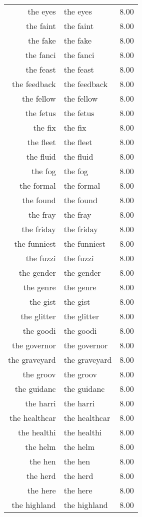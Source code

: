 \begin{table}[ht]
\begin{tabular}{rlr}
  the eyes & the eyes & 8.00 \\ 
  the faint & the faint & 8.00 \\ 
  the fake & the fake & 8.00 \\ 
  the fanci & the fanci & 8.00 \\ 
  the feast & the feast & 8.00 \\ 
  the feedback & the feedback & 8.00 \\ 
  the fellow & the fellow & 8.00 \\ 
  the fetus & the fetus & 8.00 \\ 
  the fix & the fix & 8.00 \\ 
  the fleet & the fleet & 8.00 \\ 
  the fluid & the fluid & 8.00 \\ 
  the fog & the fog & 8.00 \\ 
  the formal & the formal & 8.00 \\ 
  the found & the found & 8.00 \\ 
  the fray & the fray & 8.00 \\ 
  the friday & the friday & 8.00 \\ 
  the funniest & the funniest & 8.00 \\ 
  the fuzzi & the fuzzi & 8.00 \\ 
  the gender & the gender & 8.00 \\ 
  the genre & the genre & 8.00 \\ 
  the gist & the gist & 8.00 \\ 
  the glitter & the glitter & 8.00 \\ 
  the goodi & the goodi & 8.00 \\ 
  the governor & the governor & 8.00 \\ 
  the graveyard & the graveyard & 8.00 \\ 
  the groov & the groov & 8.00 \\ 
  the guidanc & the guidanc & 8.00 \\ 
  the harri & the harri & 8.00 \\ 
  the healthcar & the healthcar & 8.00 \\ 
  the healthi & the healthi & 8.00 \\ 
  the helm & the helm & 8.00 \\ 
  the hen & the hen & 8.00 \\ 
  the herd & the herd & 8.00 \\ 
  the here & the here & 8.00 \\ 
  the highland & the highland & 8.00 \\ 

\end{tabular}
\end{table}
